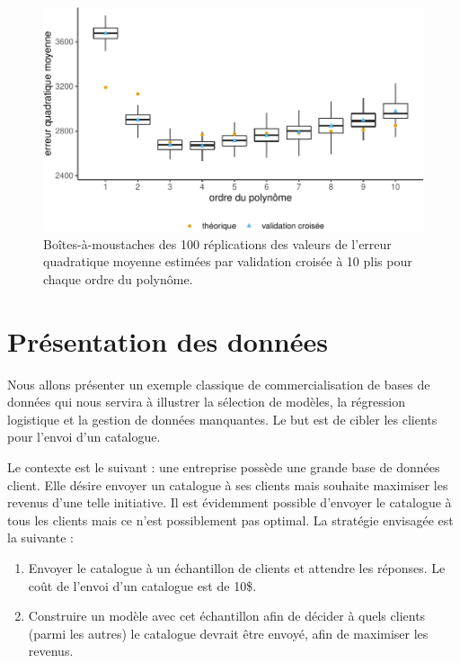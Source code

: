 \documentclass[
  11pt,
  letterpaper,
]{book}
\providecommand{\tightlist}{%
  \setlength{\itemsep}{0pt}\setlength{\parskip}{0pt}}\usepackage{longtable,booktabs,array}
\theoremstyle{definition}
\theoremstyle{remark}
\begin{document}
\begin{figure}[ht!]

{\centering \includegraphics[width=1\textwidth,height=\textheight]{./04-selectionmodeles_files/figure-pdf/fig-plotcv-1.pdf}

}

\caption{\label{fig-plotcv}Boîtes-à-moustaches des 100 réplications des
valeurs de l'erreur quadratique moyenne estimées par validation croisée
à 10 plis pour chaque ordre du polynôme.}

\end{figure}

\hypertarget{pruxe9sentation-des-donnuxe9es-1}{%
\section{Présentation des
données}\label{pruxe9sentation-des-donnuxe9es-1}}

Nous allons présenter un exemple classique de commercialisation de bases
de données qui nous servira à illustrer la sélection de modèles, la
régression logistique et la gestion de données manquantes. Le but est de
cibler les clients pour l'envoi d'un catalogue.

Le contexte est le suivant : une entreprise possède une grande base de
données client. Elle désire envoyer un catalogue à ses clients mais
souhaite maximiser les revenus d'une telle initiative. Il est évidemment
possible d'envoyer le catalogue à tous les clients mais ce n'est
possiblement pas optimal. La stratégie envisagée est la suivante :

\begin{enumerate}
\def\labelenumi{\arabic{enumi}.}
\tightlist
\item
  Envoyer le catalogue à un échantillon de clients et attendre les
  réponses. Le coût de l'envoi d'un catalogue est de 10\$.
\item
  Construire un modèle avec cet échantillon afin de décider à quels
  clients (parmi les autres) le catalogue devrait être envoyé, afin de
  maximiser les revenus.
\end{enumerate}
\end{document}
